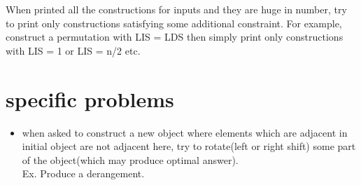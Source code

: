\documentclass[../Notes.tex]{subfiles}
\begin{document}
When printed all the constructions for inputs and they are huge in number, try to print only constructions satisfying some additional constraint. For example, construct a permutation with LIS = LDS  then simply print only constructions with LIS = 1 or LIS = n/2 etc.

\section{specific problems}
\begin{itemize}
	\item when asked to construct a new object where elements which are adjacent in initial object are not adjacent here, try to rotate(left or right shift) some part of the object(which may produce optimal answer). \\Ex. Produce a derangement.
\end{itemize}
\end{document}
